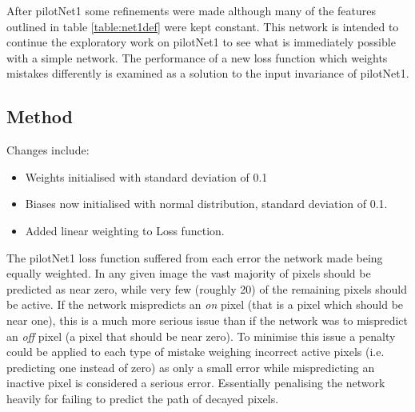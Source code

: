 After pilotNet1 some refinements were made although many of the features outlined in table \ref{table:net1def} were kept constant. 
This network is intended to continue the exploratory work on pilotNet1 to see what is immediately possible with a simple network.
The performance of a new loss function which weights mistakes differently is examined as a solution to the input invariance of pilotNet1.

\subsection{Method}
Changes include:
\begin{itemize}
    \itemsep-0.5em
    \item Weights initialised with standard deviation of 0.1
    \item Biases now initialised with normal distribution, standard deviation of 0.1.
    \item Added linear weighting to Loss function.
\end{itemize}

The pilotNet1 loss function suffered from each error the network made being equally weighted.
In any given image the vast majority of pixels should be predicted as near zero, while very few (roughly 20) of the remaining pixels should be active. 
If the network mispredicts an \textit{on} pixel (that is a pixel which should be near one), this is a much more serious issue than if the network was to mispredict an \textit{off} pixel (a pixel that should be near zero). 
To minimise this issue a penalty could be applied to each type of mistake weighing incorrect active pixels (i.e. predicting one instead of zero) as only a small error while mispredicting an inactive pixel is considered a serious error.
Essentially penalising the network heavily for failing to predict the path of decayed pixels. 

